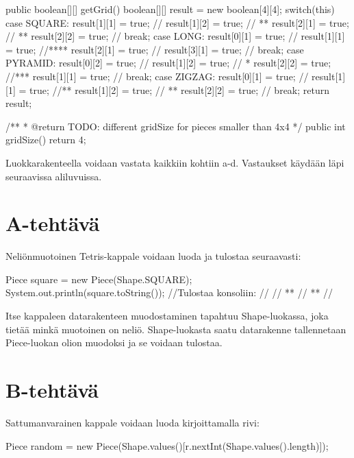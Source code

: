 \begin{javacode}
{	public boolean[][] getGrid() {
		boolean[][] result = new boolean[4][4];
		switch(this) {
			case SQUARE:
				result[1][1] = true; //
				result[1][2] = true; // **
				result[2][1] = true; // **
				result[2][2] = true; //
				break;
			case LONG:
				result[0][1] = true; //
				result[1][1] = true; //****
				result[2][1] = true; //
				result[3][1] = true; //
				break;
			case PYRAMID:
				result[0][2] = true; //
				result[1][2] = true; // *
				result[2][2] = true; //***
				result[1][1] = true; //
				break;
			case ZIGZAG:
				result[0][1] = true; //
				result[1][1] = true; //**
				result[1][2] = true; // **
				result[2][2] = true; //
				break;
		}
		return result;
	}
	
	/**
	 * @return TODO: different gridSize for pieces smaller than 4x4
	 */
	public int gridSize() {
		return 4;
	}
}
\end{javacode}

Luokkarakenteella voidaan vastata kaikkiin kohtiin a-d. Vastaukset käydään läpi
seuraavissa aliluvuissa.

\section{A-tehtävä}

\label{A-tehtävä}

Neliönmuotoinen Tetris-kappale voidaan luoda ja tulostaa seuraavasti:

\begin{javacode}
Piece square = new Piece(Shape.SQUARE);
System.out.println(square.toString());
//Tulostaa konsoliin:
//
// **
// **
//
\end{javacode}

Itse kappaleen datarakenteen muodostaminen tapahtuu Shape-luokassa, joka tietää
minkä muotoinen on neliö. Shape-luokasta saatu datarakenne tallennetaan
Piece-luokan olion muodoksi ja se voidaan tulostaa.

\section{B-tehtävä}

\label{B-tehtävä}

Sattumanvarainen kappale voidaan luoda kirjoittamalla rivi:

\begin{javacode}
Piece random = new Piece(Shape.values()[r.nextInt(Shape.values().length)]);
\end{javacode}

